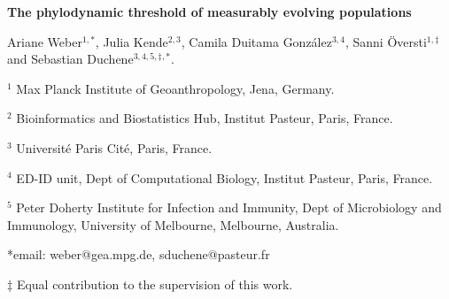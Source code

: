 \documentclass[11pt]{article}
\begin{document}
\begin{flushright}

\end{flushright}
\begin{center}
	\begin{LARGE}
	\textbf{The phylodynamic threshold of measurably evolving populations}
	\end{LARGE}

Ariane Weber$^{1,*}$, Julia Kende$^{2, 3}$, Camila Duitama González$^{3,4}$, Sanni Översti$^{1, \ddagger}$ and Sebastian Duchene$^{3,4, 5,\ddagger, *}$.
\end{center}

$^{1}$ Max Planck Institute of Geoanthropology, Jena, Germany.

$^{2}$ Bioinformatics and Biostatistics Hub, Institut Pasteur, Paris, France.

$^{3}$ Université Paris Cité, Paris, France.

$^{4}$ ED-ID unit, Dept of Computational Biology, Institut Pasteur, Paris, France.

$^{5}$ Peter Doherty Institute for Infection and Immunity, Dept of Microbiology and Immunology, University of Melbourne, Melbourne, Australia.


*email: weber@gea.mpg.de, sduchene@pasteur.fr

$\ddagger$ Equal contribution to the supervision of this work.
\newline
\end{document}
